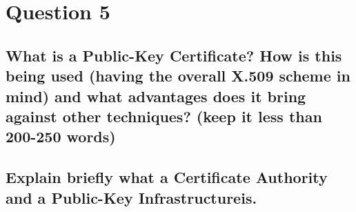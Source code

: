 \documentclass{report}
\begin{document}
	\section{Question 5}
	\startsection
		\renewcommand{\thesubsection}{\thesection.\Alph{subsection}}
		\subsection{What is a Public-Key Certificate? How is this being used (having the overall X.509 scheme in mind) and what advantages does it bring against other techniques? (keep it less than 200-250 words)}
		\startsubsection
		\closesection
		\subsection{Explain briefly what a Certificate Authority and a Public-Key Infrastructureis.}
		\startsubsection
		\closesection
	\closesection
\end{document}
